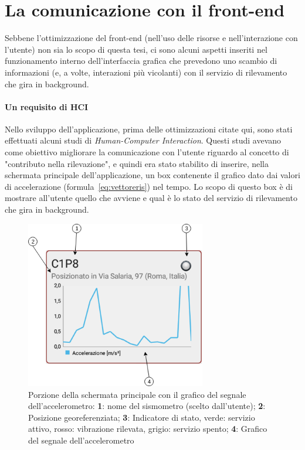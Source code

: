 \documentclass[a4paper,10pt]{memoir}
\begin{document}
\clearpage

\section{La comunicazione con il front-end}

Sebbene l'ottimizzazione del front-end (nell'uso delle risorse e nell'interazione con l'utente) non sia lo scopo di questa tesi, ci sono alcuni aspetti inseriti nel funzionamento interno dell'interfaccia grafica che prevedono uno scambio di informazioni (e, a volte, interazioni più vicolanti) con il servizio di rilevamento che gira in background.

\paragraph{Un requisito di HCI} Nello sviluppo dell'applicazione, prima delle ottimizzazioni citate qui, sono stati effettuati alcuni studi di \textit{Human-Computer Interaction}. Questi studi avevano come obiettivo migliorare la comunicazione con l'utente riguardo al concetto di "contributo nella rilevazione", e quindi era stato stabilito di inserire, nella schermata principale dell'applicazione, un box contenente il grafico dato dai valori di accelerazione (formula~\ref{eq:vettoreris}) nel tempo. Lo scopo di questo box è di mostrare all'utente quello che avviene e qual è lo stato del servizio di rilevamento che gira in background.

\begin{figure}[ht]
\centering
\includegraphics[width=0.7\textwidth]{app/activitychart2}
\caption{Porzione della schermata principale con il grafico del segnale dell'accelerometro: \textbf{1}: nome del sismometro (scelto dall'utente); \textbf{2}: Posizione georeferenziata; \textbf{3}: Indicatore di stato, verde: servizio attivo, rosso: vibrazione rilevata, grigio: servizio spento; \textbf{4}: Grafico del segnale dell'accelerometro}
\label{fig:activitychart}
\end{figure}
\end{document}
